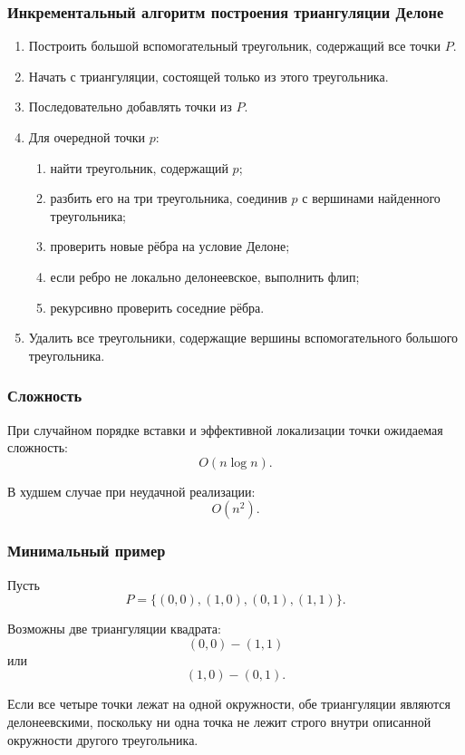 \documentclass[12pt,a4paper]{article}
\begin{document}
\subsubsection{Инкрементальный алгоритм построения триангуляции Делоне}

\begin{enumerate}
    \item Построить большой вспомогательный треугольник, содержащий все точки \(P\).
    \item Начать с триангуляции, состоящей только из этого треугольника.
    \item Последовательно добавлять точки из \(P\).
    \item Для очередной точки \(p\):
    \begin{enumerate}
        \item найти треугольник, содержащий \(p\);
        \item разбить его на три треугольника, соединив \(p\) с вершинами найденного треугольника;
        \item проверить новые рёбра на условие Делоне;
        \item если ребро не локально делонеевское, выполнить флип;
        \item рекурсивно проверить соседние рёбра.
    \end{enumerate}
    \item Удалить все треугольники, содержащие вершины вспомогательного большого треугольника.
\end{enumerate}

\subsubsection{Сложность}

При случайном порядке вставки и эффективной локализации точки ожидаемая сложность:
\[
O(n\log n).
\]

В худшем случае при неудачной реализации:
\[
O(n^2).
\]

\subsubsection{Минимальный пример}

Пусть
\[
P=\{(0,0),(1,0),(0,1),(1,1)\}.
\]

Возможны две триангуляции квадрата:
\[
(0,0)-(1,1)
\]
или
\[
(1,0)-(0,1).
\]

Если все четыре точки лежат на одной окружности, обе триангуляции являются делонеевскими, поскольку ни одна точка не лежит строго внутри описанной окружности другого треугольника.
\end{document}
